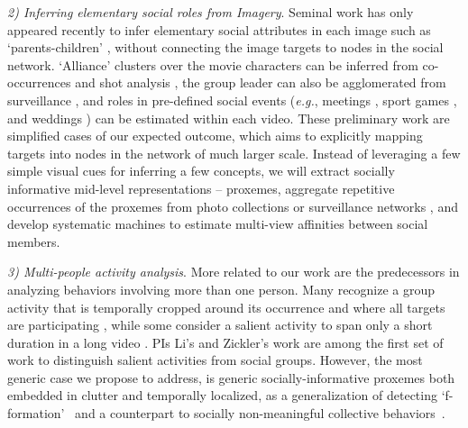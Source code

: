 \emph{2) Inferring elementary social roles from Imagery}. Seminal work has only appeared recently to infer elementary social attributes in each image such as `parents-children' \cite{Gallagher,Wang2010,Murillo2012}, without connecting the image targets to nodes in the social network. `Alliance' clusters over the movie characters can be inferred from co-occurrences and shot analysis \cite{Ding2010,Ding2011}, the group leader can also be agglomerated from surveillance \cite{Yu2009,Zhang2011}, and roles in pre-defined social events (\emph{e.g.}, meetings \cite{meetingrolerecognition}, sport games \cite{LanSM12}, and weddings \cite{FeiFeiRole2013}) can be estimated within each video. These preliminary work are simplified cases of our expected outcome, which aims to explicitly mapping targets into nodes in the network of much larger scale. Instead of leveraging a few simple visual cues for inferring a few concepts, we will extract socially informative mid-level representations -- proxemes, aggregate repetitive occurrences of the proxemes from photo collections or surveillance networks \cite{CamNetRoy,CamNetSclaroff}, and develop systematic machines to estimate multi-view affinities between social members.


\emph{3) Multi-people activity analysis}. More related to our work are the predecessors in analyzing behaviors involving more than one person. Many recognize a group activity that is temporally cropped around its occurrence and where all targets are participating \cite{Intille:act,Ni:group,Lan:Group,Patron-PerezMRZ12,PrabhakarR12}, while some consider a salient activity to span only a short duration in a long video \cite{Hongeng:act,Hakeem:act,Ba:meeting,McCowan:meeting,CHIL, Choi:recogtrack, Ryoo:group, Regh2013}. PIs Li's and Zickler's work\cite{groupdet2013,LiIJCV2012,Li2010} are among the first set of work to distinguish salient activities from social groups. However, the most generic case we propose to address, is generic socially-informative proxemes both embedded in clutter and temporally localized, as a generalization of detecting `f-formation'~\cite{Cristani:fformation} and a counterpart to socially non-meaningful collective behaviors~\cite{Amer:group}.



